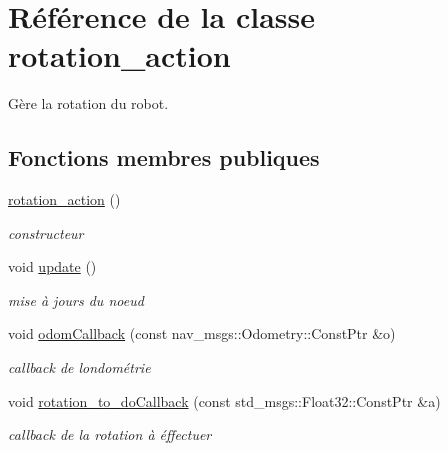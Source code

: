 \hypertarget{classrotation__action}{}\section{Référence de la classe rotation\+\_\+action}
\label{classrotation__action}


Gère la rotation du robot.  


\subsection*{Fonctions membres publiques}
\begin{DoxyCompactItemize}
\item 
\hyperlink{classrotation__action_af35b8bf6548d1992bacff66a3cea57df}{rotation\+\_\+action} ()
\begin{DoxyCompactList}\small\item\em constructeur \end{DoxyCompactList}\item 
void \hyperlink{classrotation__action_a36329542f86b36a25dcc5b281a0b8aed}{update} ()
\begin{DoxyCompactList}\small\item\em mise à jours du noeud \end{DoxyCompactList}\item 
void \hyperlink{classrotation__action_a6d541aa63299c89c26dfb3eda1478a13}{odom\+Callback} (const nav\+\_\+msgs\+::\+Odometry\+::\+Const\+Ptr \&o)
\begin{DoxyCompactList}\small\item\em callback de l\textquotesingle{}ondométrie \end{DoxyCompactList}\item 
void \hyperlink{classrotation__action_ad23f7b68ddafdca515cbb32dc8c6464e}{rotation\+\_\+to\+\_\+do\+Callback} (const std\+\_\+msgs\+::\+Float32\+::\+Const\+Ptr \&a)
\begin{DoxyCompactList}\small\item\em callback de la rotation à éffectuer \end{DoxyCompactList}\end{DoxyCompactItemize}

